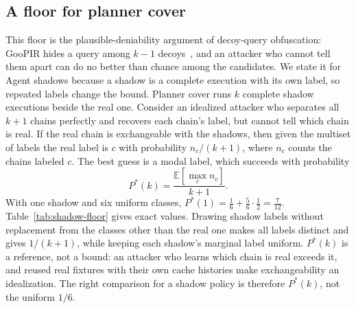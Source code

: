 \subsection{A floor for planner cover}\label{sec:floor}
This floor is the plausible-deniability argument of decoy-query obfuscation: GooPIR hides a query among $k-1$ decoys~\cite{domingoferrer2009goopir}, and an attacker who cannot tell them apart can do no better than chance among the candidates. We state it for Agent shadows because a shadow is a complete execution with its own label, so repeated labels change the bound. Planner cover runs $k$ complete shadow executions beside the real one. Consider an idealized attacker who separates all $k+1$ chains perfectly and recovers each chain's label, but cannot tell which chain is real. If the real chain is exchangeable with the shadows, then given the multiset of labels the real label is $c$ with probability $n_c/(k+1)$, where $n_c$ counts the chains labeled $c$. The best guess is a modal label, which succeeds with probability
\[P^*(k)=\frac{\mathbb{E}[\max_c n_c]}{k+1}.\]
With one shadow and six uniform classes, $P^*(1)=\tfrac16+\tfrac56\cdot\tfrac12=\tfrac7{12}$. Table~\ref{tab:shadow-floor} gives exact values. Drawing shadow labels without replacement from the classes other than the real one makes all labels distinct and gives $1/(k+1)$, while keeping each shadow's marginal label uniform. $P^*(k)$ is a reference, not a bound: an attacker who learns which chain is real exceeds it, and reused real fixtures with their own cache histories make exchangeability an idealization. The right comparison for a shadow policy is therefore $P^*(k)$, not the uniform $1/6$.


